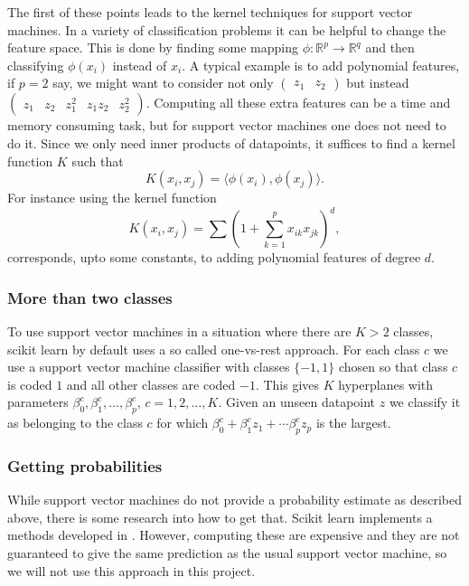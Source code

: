 \documentclass[parskip=half]{scrartcl}
\theoremstyle{definition}
\theoremstyle{remark}
\newcommand{\R}{\mathbb{R}}
\begin{document}
The first of these points leads to the kernel techniques for support vector machines.
In a variety of classification problems it can be helpful to change the feature space. 
This is done by finding some mapping $\phi \colon \R^p \to \R^q$ and then classifying $\phi(x_i)$ instead of $x_i$. 
A typical example is to add polynomial features, if $p = 2$ say, we might want to consider not only $\begin{pmatrix} z_1 & z_2 \end{pmatrix}$ but instead $\begin{pmatrix} z_1 & z_2 & z_1^2 & z_1 z_2 & z_2^2 \end{pmatrix}$.  
Computing all these extra features can be a time and memory consuming task, but for support vector machines one does not need to do it. 
Since we only need inner products of datapoints, it suffices to find a kernel function $K$ such that 
\[
	K(x_i, x_j) = \langle \phi(x_i), \phi(x_j) \rangle.
\]
For instance using the kernel function
\[
	K(x_i, x_j) = \sum \left( 1 + \sum_{k=1}^p x_{ik} x_{jk} \right)^d,
\]
corresponds, upto some constants, to adding polynomial features of degree $d$. 

\subsubsection{More than two classes}

To use support vector machines in a situation where there are $K > 2$ classes, scikit learn by default uses a so called one-vs-rest approach. 
For each class $c$ we use a support vector machine classifier with classes $\{-1, 1\}$ chosen so that class $c$ is coded $1$ and all other classes are coded $-1$.
This gives $K$ hyperplanes with parameters $\beta_0^c, \beta_1^c, \ldots, \beta_p^c$, $c = 1,2,\ldots, K$.
Given an unseen datapoint $z$ we classify it as belonging to the class $c$ for which $\beta_0^c + \beta_1^c z_1 + \cdots \beta_p^c z_p$ is the largest.    

\subsubsection{Getting probabilities}

While support vector machines do not provide a probability estimate as described above, there is some research into how to get that. 
Scikit learn implements a methods developed in \cite{wual}.
However, computing these are expensive and they are not guaranteed to give the same prediction as the usual support vector machine, so we will not use this approach in this project. 
  
\end{document}
